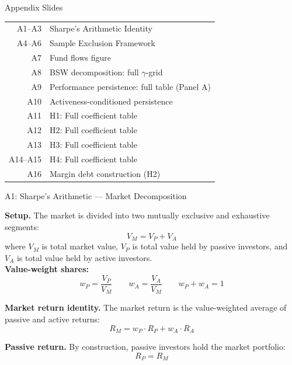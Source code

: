 \documentclass[10pt, aspectratio=169]{beamer}
\begin{document}
\begin{frame}{Appendix Slides}
  \vfill
  \begin{center}
    \footnotesize
    \begin{tabular}{rl}
      A1--A3   & Sharpe's Arithmetic Identity \\[3pt]
      A4--A6   & Sample Exclusion Framework \\[3pt]
      A7       & Fund flows figure \\[3pt]
      A8       & BSW decomposition: full $\gamma$-grid \\[3pt]
      A9       & Performance persistence: full table (Panel A) \\[3pt]
      A10      & Activeness-conditioned persistence \\[3pt]
      A11      & H1: Full coefficient table \\[3pt]
      A12      & H2: Full coefficient table \\[3pt]
      A13      & H3: Full coefficient table \\[3pt]
      A14--A15 & H4: Full coefficient table \\[3pt]
      A16      & Margin debt construction (H2) \\
    \end{tabular}
  \end{center}
  \vfill
\end{frame}


\begin{frame}{A1: Sharpe's Arithmetic — Market Decomposition}

  \textbf{Setup.} The market is divided into two mutually exclusive and exhaustive segments:
  \[
    V_M = V_P + V_A
  \]
  where $V_M$ is total market value, $V_P$ is total value held by passive investors,
  and $V_A$ is total value held by active investors.\\[6pt]

  \textbf{Value-weight shares:}
  \[
    w_P = \frac{V_P}{V_M} \qquad w_A = \frac{V_A}{V_M} \qquad w_P + w_A = 1
  \]

  \textbf{Market return identity.} The market return is the value-weighted average
  of passive and active returns:
  \[
    R_M = w_P \cdot R_P + w_A \cdot R_A
  \]

  \textbf{Passive return.} By construction, passive investors hold the market portfolio:
  \[
    R_P = R_M
  \]

\end{frame}
\end{document}
